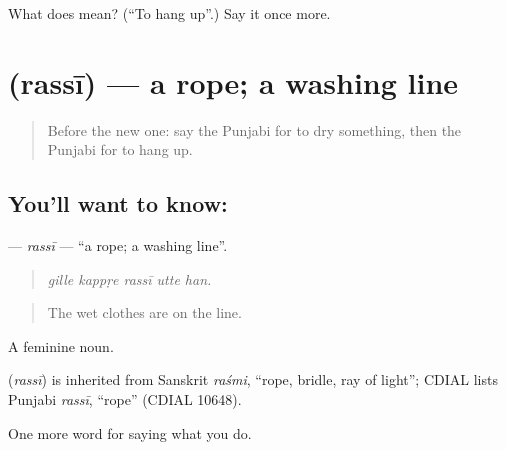 \begin{tcolorbox}[breakable,colback=teal!4,colframe=teal!35!black,title={Before you move on}]
What does  mean? (\textquotedblleft{}To hang up\textquotedblright{}.) Say it once more.
\end{tcolorbox}
\section[\texorpdfstring{\pa{ਰੱਸੀ} (rassī)}{ਰੱਸੀ (rassī)}]{ (rassī) — a rope; a washing line}

\label{lesson:PA-C228-rassi}



\begin{quote}
Before the new one: say the Punjabi for to dry something, then the Punjabi for to hang up.
\end{quote}

\subsection*{You'll want to know: }
\textbf{} — \emph{rassī} — \textquotedblleft{}a rope; a washing line\textquotedblright{}.

\begin{quote}
    
\end{quote}

\begin{quote}
\emph{gille kappṛe rassī utte han.}
\end{quote}

\begin{quote}
The wet clothes are on the line.
\end{quote}

A feminine noun.

\begin{cousinweb}
\textbf{} (\emph{rassī}) is inherited from Sanskrit \emph{raśmi}, \textquotedblleft{}rope, bridle, ray of light\textquotedblright{}; CDIAL lists Punjabi \emph{rassī}, \textquotedblleft{}rope\textquotedblright{} (CDIAL 10648).
\end{cousinweb}

\begin{grammarlens}[title={What you've built}]
One more word for saying what you do.
\end{grammarlens}

